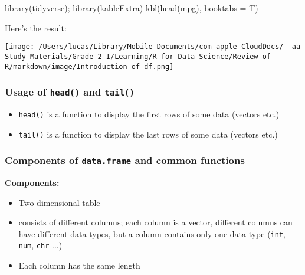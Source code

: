 \documentclass[
]{article}
\let\oldincludegraphics\includegraphics
\renewcommand{\includegraphics}[2][]{\begin{center}\oldincludegraphics[#1]{#2}\end{center}}
\newenvironment{Shaded}{}{}
\newcommand{\AttributeTok}[1]{\textcolor[rgb]{0.49,0.56,0.16}{#1}}
\newcommand{\FunctionTok}[1]{\textcolor[rgb]{0.02,0.16,0.49}{#1}}
\newcommand{\NormalTok}[1]{#1}
\begin{document}
\begin{Shaded}
\begin{Highlighting}[]
\FunctionTok{library}\NormalTok{(tidyverse);}
\FunctionTok{library}\NormalTok{(kableExtra)}
\FunctionTok{kbl}\NormalTok{(}\FunctionTok{head}\NormalTok{(mpg), }
    \AttributeTok{booktabs =}\NormalTok{ T)}
\end{Highlighting}
\end{Shaded}

Here's the result:

\texttt{[image: /Users/lucas/Library/Mobile Documents/com~apple~CloudDocs/~~aa Study Materials/Grade 2 I/Learning/R for Data Science/Review of R/markdown/image/Introduction of df.png]}

\hypertarget{usage-of-head-and-tail}{%
\subsubsection{\texorpdfstring{\textbf{Usage of \texttt{head()} and
\texttt{tail()}}}{Usage of head() and tail()}}\label{usage-of-head-and-tail}}

\begin{itemize}
\item
  \texttt{head()} is a function to display the first rows of some data
  (vectors etc.)
\item
  \texttt{tail()} is a function to display the last rows of some data
  (vectors etc.)
\end{itemize}

\hypertarget{components-of-dataframe-and-common-functions}{%
\subsubsection{\texorpdfstring{Components of \texttt{data.frame} and
common
functions}{Components of data.frame and common functions}}\label{components-of-dataframe-and-common-functions}}

\textbf{Components:}

\begin{itemize}
\item
  Two-dimensional table
\item
  consists of different columns; each column is a vector, different
  columns can have different data types, but a column contains only one
  data type (\texttt{int}, \texttt{num}, \texttt{chr} ...)
\item
  Each column has the same length
\end{itemize}
\end{document}
